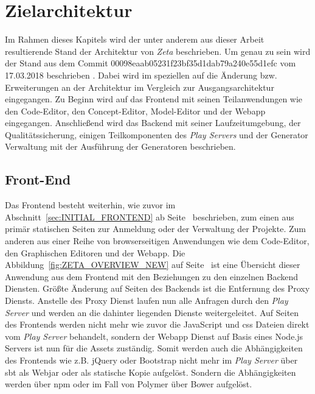 \chapter{Zielarchitektur}
\label{ch:TARGET}

Im Rahmen dieses Kapitels wird der unter anderem aus dieser Arbeit resultierende Stand der Architektur von \textit{Zeta} beschrieben. Um genau zu sein wird der Stand aus dem Commit 00098eaab05231f23bf35d1dab79a240e55d1efc vom 17.03.2018 beschrieben \cite{zeta_new}. Dabei wird im speziellen auf die Änderung bzw. Erweiterungen an der Architektur im Vergleich zur Ausgangsarchitektur eingegangen. Zu Beginn wird auf das Frontend mit seinen Teilanwendungen wie den Code-Editor, den Concept-Editor, Model-Editor und der Webapp eingegangen. Anschließend wird das Backend mit seiner Laufzeitumgebung, der Qualitätssicherung, einigen Teilkomponenten des \textit{Play Servers} und der Generator Verwaltung mit der Ausführung der Generatoren beschrieben.

\section{Front-End}

Das Frontend besteht weiterhin, wie zuvor im Abschnitt~\ref{sec:INITIAL_FRONTEND} ab Seite~\pageref{sec:INITIAL_FRONTEND} beschrieben, zum einen aus primär statischen Seiten zur Anmeldung oder der Verwaltung der Projekte. Zum anderen aus einer Reihe von browserseitigen Anwendungen wie dem Code-Editor, den Graphischen Editoren und der Webapp. Die Abbildung~\ref{fig:ZETA_OVERVIEW_NEW} auf Seite~\pageref{fig:ZETA_OVERVIEW_NEW} ist eine Übersicht dieser Anwendung aus dem Frontend mit den Beziehungen zu den einzelnen Backend Diensten. Größte Änderung auf Seiten des Backends ist die Entfernung des Proxy Diensts. Anstelle des Proxy Dienst laufen nun alle Anfragen durch den \textit{Play Server} und werden an die dahinter liegenden Dienste weitergeleitet. Auf Seiten des Frontends werden nicht mehr wie zuvor die JavaScript und \ac{css} Dateien direkt vom \textit{Play Server} behandelt, sondern der Webapp Dienst auf Basis eines Node.js Servers ist nun für die Assets zuständig. Somit werden auch die Abhängigkeiten des Frontends wie z.B. jQuery oder Bootstrap nicht mehr im \textit{Play Server} über \ac{sbt} als Webjar oder als statische Kopie aufgelöst. Sondern die Abhängigkeiten werden über \ac{npm} oder im Fall von Polymer über Bower aufgelöst.

